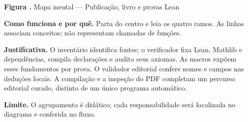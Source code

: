 {\small\textbf{Figura \thefigure.} Mapa mental --- Publicação, livro e provas Lean}\par\smallskip
\noindent\textbf{Como funciona e por quê.} Parta do centro e leia os quatro ramos. As linhas associam conceitos; não representam chamadas de funções.\par
\noindent\textbf{Justificativa.} O inventário identifica fontes; o verificador fixa Lean, Mathlib e dependências, compila declarações e audita seus axiomas. As macros expõem esses fundamentos por prova. O validador editorial confere nomes e campos nas deduções locais. A compilação e a inspeção do PDF completam um percurso editorial curado, distinto de um único programa automático.\par
\noindent\textbf{Limite.} O agrupamento é didático; cada responsabilidade será localizada no diagrama e conferida no fluxo.\par\smallskip
{}
